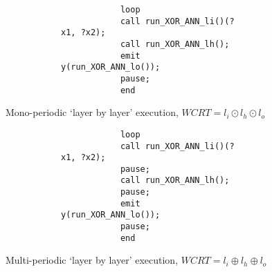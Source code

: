 
\begin{figure}[h]
	\centering
	\begin{subfigure}[h]{0.6\textwidth}
		\centering
		\begin{subfigure}[h]{0.3\textwidth}
			\centering
			
		\end{subfigure}%
		\begin{subfigure}[h]{0.66\textwidth}
			\vspace{3mm}
			\begin{lstlisting}
			loop
			call run_XOR_ANN_li()(?x1, ?x2);
			call run_XOR_ANN_lh();
			emit y(run_XOR_ANN_lo());
			pause;
			end
			\end{lstlisting}
		\end{subfigure}
	\end{subfigure}
\caption{Mono-periodic `layer by layer' execution, $WCRT = l_i \odot l_h \odot l_o$}
\label{fig:tca-bb}
\end{figure}

\begin{figure}[h]	
	\centering
	\vspace{5mm}
	\begin{subfigure}[h]{0.5\textwidth}
		\centering
		\begin{subfigure}[h]{0.3\textwidth}
			\centering
			
		\end{subfigure}%
		\begin{subfigure}[h]{0.66\textwidth}
			\begin{lstlisting}
			loop
			call run_XOR_ANN_li()(?x1, ?x2);
			pause;
			call run_XOR_ANN_lh();
			pause;
			emit y(run_XOR_ANN_lo());
			pause;
			end
			\end{lstlisting}
		\end{subfigure}
	\end{subfigure}
\caption{Multi-periodic `layer by layer' execution, $WCRT = l_i \oplus l_h \oplus l_o$}
\label{fig:tca-layers}
\end{figure}

